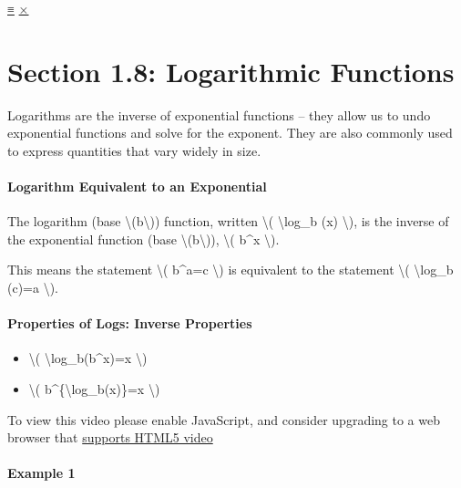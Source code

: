 \protect\hyperlink{main-nav}{≡} \protect\hyperlink{close-nav}{×}

\hypertarget{section-1.8-logarithmic-functions}{%
\section{Section 1.8: Logarithmic
Functions}\label{section-1.8-logarithmic-functions}}

Logarithms are the inverse of exponential functions -- they allow us to
undo exponential functions and solve for the exponent. They are also
commonly used to express quantities that vary widely in size.

\hypertarget{logarithm-equivalent-to-an-exponential}{%
\paragraph{Logarithm Equivalent to an
Exponential}\label{logarithm-equivalent-to-an-exponential}}

The logarithm (base \textbackslash{}(b\textbackslash{})) function,
written \textbackslash{}( \textbackslash{}log\_b (x) \textbackslash{}),
is the inverse of the exponential function (base
\textbackslash{}(b\textbackslash{})), \textbackslash{}( b\^{}x
\textbackslash{}).

This means the statement \textbackslash{}( b\^{}a=c \textbackslash{}) is
equivalent to the statement \textbackslash{}( \textbackslash{}log\_b
(c)=a \textbackslash{}).

\hypertarget{properties-of-logs-inverse-properties}{%
\paragraph{Properties of Logs: Inverse
Properties}\label{properties-of-logs-inverse-properties}}

\begin{itemize}
\tightlist
\item
  \textbackslash{}( \textbackslash{}log\_b(b\^{}x)=x \textbackslash{})
\item
  \textbackslash{}( b\^{}\{\textbackslash{}log\_b(x)\}=x
  \textbackslash{})
\end{itemize}

To view this video please enable JavaScript, and consider upgrading to a
web browser that \href{http://videojs.com/html5-video-support/}{supports
HTML5 video}

\hypertarget{example-1}{%
\paragraph{Example 1}\label{example-1}}


